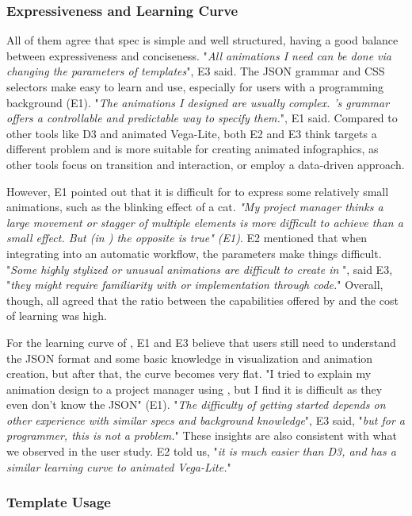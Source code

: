\subsubsection{Expressiveness and Learning Curve}

All of them agree that \gaia{} spec is simple and well structured, having a good balance between expressiveness and conciseness.
"\textit{All animations I need can be done via changing the parameters of templates}", E3 said.
The JSON grammar and CSS selectors make \gaia{} easy to learn and use, especially for users with a programming background (E1).
"\textit{The animations I designed are usually complex. \gaia{}'s grammar offers a controllable and predictable way to specify them.}", E1 said.
Compared to other tools like D3 and animated Vega-Lite, both E2 and E3 think \gaia{} targets a different problem and is more suitable for creating animated infographics, as other tools focus on transition and interaction, or employ a data-driven approach.

However, E1 pointed out that it is difficult for \gaia{} to express some relatively small animations, such as the blinking effect of a cat.
\textit{"My project manager thinks a large movement or stagger of multiple elements is more difficult to achieve than a small effect. But (in \gaia{}) the opposite is true" (E1)}.
E2 mentioned that when integrating \gaia{} into an automatic workflow, the parameters make things difficult.
"\textit{Some highly stylized or unusual animations are difficult to create in \gaia{}}", said E3, "\textit{they might require familiarity with \gaia{} or implementation through code.}"
Overall, though, all agreed that the ratio between the capabilities offered by \gaia{} and the cost of learning was high.

For the learning curve of \gaia{}, E1 and E3 believe that users still need to understand the JSON format and some basic knowledge in visualization and animation creation, but after that, the curve becomes very flat. 
"I tried to explain my animation design to a project manager using \gaia{}, but I find it is difficult as they even don't know the JSON" (E1).
"\textit{The difficulty of getting started depends on other experience with similar specs and background knowledge}", E3 said, "\textit{but for a programmer, this is not a problem.}"
These insights are also consistent with what we observed in the user study. 
E2 told us, "\textit{it is much easier than D3, and has a similar learning curve to animated Vega-Lite.}"

\subsubsection{Template Usage}

